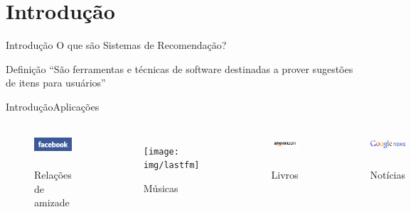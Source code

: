 \section[Introdução]{Introdução}
\begin{frame}{Introdução}
O que são Sistemas de Recomendação?
\begin{block}{Definição}
``São ferramentas e técnicas de software destinadas a prover sugestões de itens para usuários'' \cite{ricci2011introduction-chap1}
\end{block}
\end{frame}

\begin{frame}{Introdução}{Aplicações}
\begin{columns}[c] %


\begin{figure}[ht]
    \begin{center}
    \includegraphics[height=30px]{img/facebook}

    Relações de amizade
    \end{center}
\end{figure}

\begin{figure}[ht]
    \begin{center}
    \texttt{[image: img/lastfm]}

    Músicas
    \end{center}
\end{figure}


\begin{figure}[ht]
    \begin{center}
    \includegraphics[height=30px]{img/amazon}

    Livros
    \end{center}
\end{figure}

\begin{figure}[ht]
    \begin{center}
    \includegraphics[height=30px]{img/google-news}

    Notícias
    \end{center}
\end{figure}

\end{columns}
\end{frame}

